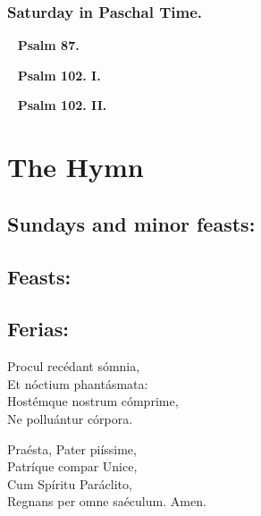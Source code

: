 \documentclass[a5paper,12pt,twoside,openany]{memoir}
\def\startParallel{}
\def\stopParallel{}
\let\oldtextbf\textbf
\newcommand\psalm[1]{~ \hfill \oldtextbf{Psalm #1.} \hfill ~}
\begin{document}
\startParallel

\stopParallel



\subsection{Saturday in Paschal Time.}


\psalm{87}

\psalm{102. I}

\psalm{102. II}






\chapter{The Hymn}

\section{Sundays and minor feasts:}


\section{Feasts:}


\section{Ferias:}


Procul recédant sómnia,\\
Et nóctium phantásmata:\\
Hostémque nostrum cómprime,\\
Ne polluántur córpora.

Praésta, Pater piíssime,\\
Patríque compar Unice,\\
Cum Spíritu Paráclito,\\
Regnans per omne saéculum.  Amen.
\end{document}
